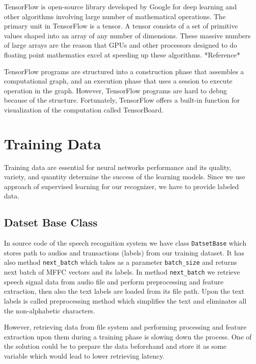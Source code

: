 TensorFlow is open-source library developed by Google for deep learning and other algorithms involving large number of mathematical operations.
The primary unit in TensorFlow is a tensor.
A tensor consists of a set of primitive values shaped into an array of any number of dimensions.
These massive numbers of large arrays are the reason that GPUs and other processors designed to do floating point mathematics excel at speeding up these algorithms. *Reference*

TensorFlow programs are structured into a construction phase that assembles a computational graph, and an execution phase that uses a session to execute operation in the graph.
However, TensorFlow programs are hard to debug because of the structure. Fortunately, TensorFlow offers a built-in function for visualization of the computation called TensorBoard.

\section{Training Data}

Training data are essential for neural networks performance and its quality, variety, and quantity determine the success of the learning models.
Since we use approach of supervised learning for our recognizer, we have to provide labeled data.

\subsection{Datset Base Class}

In source code of the speech recognition system we have class \texttt{DatsetBase} which stores path to audios and transactions (labels) from our training dataset.
It has also method \texttt{next\_batch} which takes as a parameter \texttt{batch\_size} and returns next batch of MFFC vectors and its labels.
In method \texttt{next\_batch} we retrieve speech signal data from audio file and perform preprocessing and feature extraction, then also the text labels are loaded from its file path.
Upon the text labels is called preprocessing method which simplifies the text and eliminates all the non-alphabetic characters.

However, retrieving data from file system and performing processing and feature extraction upon them during a training phase is slowing down the process.
One of the solution could be to prepare the data beforehand and store it as some variable which would lead to lower retrieving latency.

